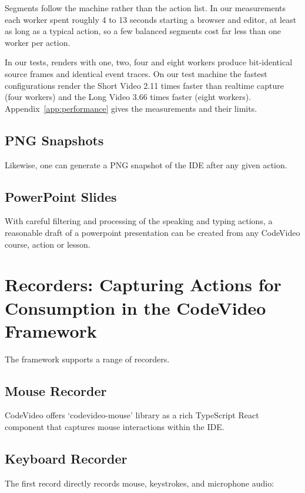 \documentclass[11pt, a4paper]{article}
\begin{document}
Segments follow the machine rather than the action list. In our measurements each worker spent roughly 4 to 13 seconds starting a browser and editor, at least as long as a typical action, so a few balanced segments cost far less than one worker per action.

In our tests, renders with one, two, four and eight workers produce bit-identical source frames and identical event traces. On our test machine the fastest configurations render the Short Video 2.11 times faster than realtime capture (four workers) and the Long Video 3.66 times faster (eight workers). Appendix~\ref{app:performance} gives the measurements and their limits.

\subsection{PNG Snapshots}

Likewise, one can generate a PNG snapshot of the IDE after any given action.

\subsection{PowerPoint Slides}

With careful filtering and processing of the speaking and typing actions, a reasonable draft of a powerpoint presentation can be created from any CodeVideo course, action or lesson.

\section{Recorders: Capturing Actions for Consumption in the CodeVideo Framework}

The framework supports a range of recorders.

\subsection{Mouse Recorder}

CodeVideo offers `codevideo-mouse' library as a rich TypeScript React component that captures mouse interactions within the IDE.

\subsection{Keyboard Recorder}

The first record directly records mouse, keystrokes, and microphone audio:
\end{document}
